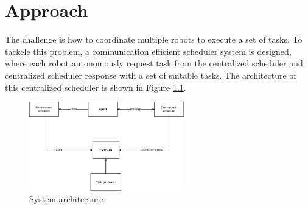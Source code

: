 \chapter{Approach}





The challenge is how to coordinate multiple robots to execute a set of tasks. To tackele this problem, a communication efficient scheduler system is designed, where each robot autonomously request task from the centralized scheduler and centralized scheduler response with a set of suitable tasks. The architecture of this centralized scheduler is shown in Figure \ref{fig:system_architecture}.


\begin{figure}[htbp]
	\centering
	\includegraphics[width = 0.6\textwidth]{content/images/ch3/architecture.drawio.png}
	\caption{System architecture}
	\label{fig:system_architecture}
\end{figure}

